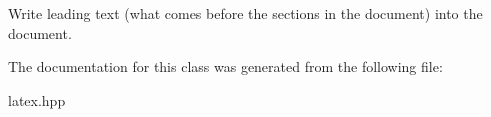 Write leading text (what comes before the sections in the document) into the document. 

The documentation for this class was generated from the following file\-:\begin{DoxyCompactItemize}
\item 
latex.\-hpp\end{DoxyCompactItemize}
